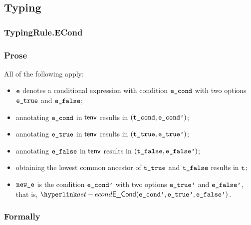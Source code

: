\subsection{Typing}
\subsubsection{TypingRule.ECond \label{sec:TypingRule.ECond}}
\subsubsection{Prose}
All of the following apply:
\begin{itemize}
  \item $\ve$ denotes a conditional expression with condition $\econd$ with two options $\etrue$ and $\efalse$;
  \item annotating $\econd$ in $\tenv$ results in $(\tcond, \econdp)$\ProseOrTypeError;
  \item annotating $\etrue$ in $\tenv$ results in $(\ttrue, \etruep)$\ProseOrTypeError;
  \item annotating $\efalse$ in $\tenv$ results in $(\tfalse, \efalsep)$;
  \item obtaining the lowest common ancestor of $\ttrue$ and $\tfalse$ results in $\vt$\ProseOrTypeError;
  \item $\newe$ is the condition $\econdp$ with two options $\etruep$ and $\efalsep$, that is, $\ECond(\econdp, \etruep, \efalsep)$.
\end{itemize}
\subsubsection{Formally}
\begin{mathpar}
\end{mathpar}

